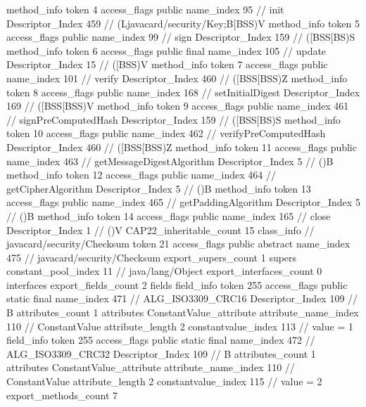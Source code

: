 {{{{{				}
				method_info {
					token	4
					access_flags	public
					name_index	95		// init
					Descriptor_Index	459		// (Ljavacard/security/Key;B[BSS)V
				}
				method_info {
					token	5
					access_flags	public
					name_index	99		// sign
					Descriptor_Index	159		// ([BSS[BS)S
				}
				method_info {
					token	6
					access_flags	public final
					name_index	105		// update
					Descriptor_Index	15		// ([BSS)V
				}
				method_info {
					token	7
					access_flags	public
					name_index	101		// verify
					Descriptor_Index	460		// ([BSS[BSS)Z
				}
				method_info {
					token	8
					access_flags	public
					name_index	168		// setInitialDigest
					Descriptor_Index	169		// ([BSS[BSS)V
				}
				method_info {
					token	9
					access_flags	public
					name_index	461		// signPreComputedHash
					Descriptor_Index	159		// ([BSS[BS)S
				}
				method_info {
					token	10
					access_flags	public
					name_index	462		// verifyPreComputedHash
					Descriptor_Index	460		// ([BSS[BSS)Z
				}
				method_info {
					token	11
					access_flags	public
					name_index	463		// getMessageDigestAlgorithm
					Descriptor_Index	5		// ()B
				}
				method_info {
					token	12
					access_flags	public
					name_index	464		// getCipherAlgorithm
					Descriptor_Index	5		// ()B
				}
				method_info {
					token	13
					access_flags	public
					name_index	465		// getPaddingAlgorithm
					Descriptor_Index	5		// ()B
				}
				method_info {
					token	14
					access_flags	public
					name_index	165		// close
					Descriptor_Index	1		// ()V
				}
			}
			CAP22_inheritable_count	15
		}
		class_info {		// javacard/security/Checksum
			token	21
			access_flags	public abstract
			name_index	475		// javacard/security/Checksum
			export_supers_count	1
			supers {
				constant_pool_index	11		// java/lang/Object
			}
			export_interfaces_count	0
			interfaces {
			}
			export_fields_count	2
			fields {
			field_info {
				token	255
				access_flags	public static final
				name_index	471		// ALG_ISO3309_CRC16
				Descriptor_Index	109		// B
				attributes_count	1
				attributes {
				ConstantValue_attribute {
					attribute_name_index	110		// ConstantValue
					attribute_length	2
					constantvalue_index	113		// value = 1
				}
				}
			}
			field_info {
				token	255
				access_flags	public static final
				name_index	472		// ALG_ISO3309_CRC32
				Descriptor_Index	109		// B
				attributes_count	1
				attributes {
				ConstantValue_attribute {
					attribute_name_index	110		// ConstantValue
					attribute_length	2
					constantvalue_index	115		// value = 2
				}
				}
			}
			}
			export_methods_count	7
}}}
